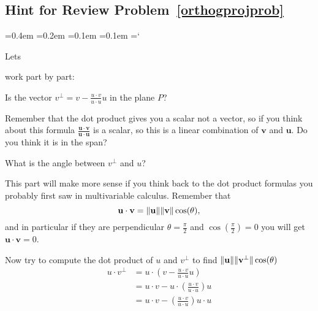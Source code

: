 
\subsection*{Hint  for Review Problem~\ref{orthogprojprob}}

{\ttfamily
{}\font=0.4em
\font=0.2em
\font=0.1em
\font=0.1em
\hyphenchar\font=`\-


\hypertarget{scripts_orthonormal_bases_hint3}{Lets} 
work part by part:
\begin{enumext}[label=\alph*,wrap-label=(#1)]
\item Is the vector $v^\bot = v-\frac{u\cdot v}{u\cdot u}u$ in the plane $P$? 

Remember that the dot product gives you a scalar not a vector, so if you think about this formula $\frac{\mathbf{u}\cdot \mathbf{v}}{\mathbf{u}\cdot \mathbf{u}}$ is a scalar, so this is a linear combination of $\mathbf{v}$ and $\mathbf{u}$. Do you think it is in the span?

\item What is the angle between $v^\bot$ and $u$?

This part will make more sense if you think back to the dot product formulas you probably first saw in multivariable calculus. Remember that 
\[\mathbf{u}\cdot \mathbf{v} = \|\mathbf{u}\| \|\mathbf{v}\| \cos(\theta),
\] 
and in particular if they are perpendicular $\theta = \frac{\pi}{2}$ and $\cos(\frac{\pi}{2}) = 0$ you will get $\mathbf{u}\cdot \mathbf{v} = 0$.

Now try to compute the dot product of $u$ and $v^\bot$ to find $ \|\mathbf{u}\| \|\mathbf{v^\bot}\| \cos(\theta)$
\begin{align*}
u\cdot v^\bot &= u\cdot \left( v  -  \frac{u\cdot v}{u\cdot u}u \right) \\
&= u\cdot  v  - u\cdot \left( \frac{u\cdot v}{u\cdot u} \right)u \\
&= u\cdot  v  - \left( \frac{u\cdot v}{u\cdot u} \right) u\cdot u
\end{align*}


\end{enumext}}
